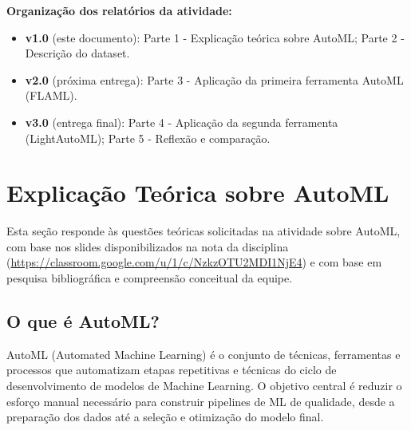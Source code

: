 \documentclass[11pt, a4paper, oneside]{article}
\begin{document}
\vspace{6mm}

\begin{infobox}
\textbf{Organização dos relatórios da atividade:}
\begin{itemize}[leftmargin=1.2cm, topsep=2pt, itemsep=2pt]
  \item \textbf{v1.0} (este documento): Parte 1 - Explicação teórica sobre AutoML; Parte 2 - Descrição do dataset.
  \item \textbf{v2.0} (próxima entrega): Parte 3 - Aplicação da primeira ferramenta AutoML (FLAML).
  \item \textbf{v3.0} (entrega final): Parte 4 - Aplicação da segunda ferramenta (LightAutoML); Parte 5 - Reflexão e comparação.
\end{itemize}
\end{infobox}

\newpage

\tableofcontents
\newpage

\section{Explicação Teórica sobre AutoML}
\label{sec:automl-teoria}

\begin{infobox}
Esta seção responde às questões teóricas solicitadas na atividade sobre AutoML, com
base nos slides disponibilizados na nota da disciplina
(\url{https://classroom.google.com/u/1/c/NzkzOTU2MDI1NjE4}) e com base em
pesquisa bibliográfica e compreensão conceitual da equipe.
\end{infobox}

\subsection{O que é AutoML?}
\label{sec:o-que-e-automl}

AutoML (Automated Machine Learning) é o conjunto de técnicas, ferramentas e processos
que automatizam etapas repetitivas e técnicas do ciclo de desenvolvimento de modelos
de Machine Learning. O objetivo central é reduzir o esforço manual necessário para
construir pipelines de ML de qualidade, desde a preparação dos dados até a seleção e
otimização do modelo final.
\end{document}

